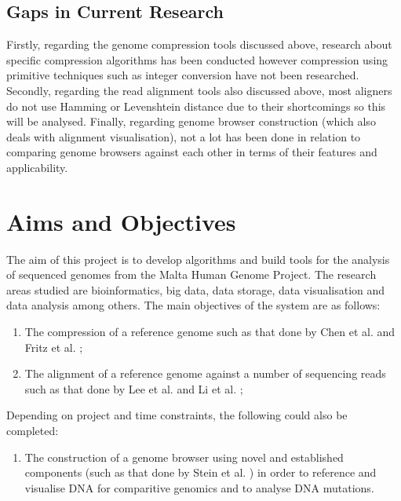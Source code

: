 \documentclass{csfyp}
\begin{document}
\subsection{Gaps in Current Research}\vspace{-2ex}
Firstly, regarding the genome compression tools discussed above, research about specific compression algorithms has been conducted however compression using primitive techniques such as integer conversion have not been researched.
Secondly, regarding the read alignment tools also discussed above,  most aligners do not use Hamming or Levenshtein distance due to their shortcomings so this will be analysed.  Finally, regarding genome browser construction (which also deals with alignment visualisation), not a lot has been done in relation to comparing genome browsers against each other in terms of their features and applicability.       

\section{Aims and Objectives}\vspace{-2ex}

The aim of this project is to develop algorithms and build tools for the analysis of sequenced genomes from the Malta Human Genome Project.  The research areas studied are bioinformatics, big data, data storage, data visualisation and data analysis among others.  The main objectives of the system are as follows:

\begin{enumerate}[nolistsep]

   \item The compression of a reference genome such as that done by Chen et al. \cite{gencompress} and Fritz et al. \cite{refcompression};

  \item The alignment of a reference genome against a number of sequencing reads such as that done by Lee et al. \cite{cgreads} and Li et al. \cite{bwtransform};

\end{enumerate}

Depending on project and time constraints, the following could also be completed:

\begin{enumerate}[nolistsep]

  \item The construction of a genome browser using novel and established components (such as that done by Stein et al. \cite{genericbrowser}) in order to reference and visualise DNA for comparitive genomics and to analyse DNA mutations.

\end{enumerate}
\end{document}
